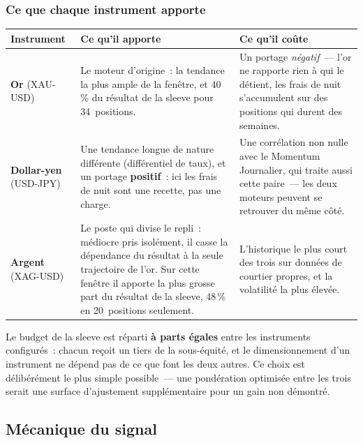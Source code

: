 \subsubsection*{Ce que chaque instrument apporte}

\begin{center}
\renewcommand{\arraystretch}{1.3}
\small
\begin{tabular}{>{\raggedright\arraybackslash}p{2.6cm}>{\raggedright\arraybackslash}p{6.0cm}>{\raggedright\arraybackslash}p{6.0cm}}
\toprule
\textbf{Instrument} & \textbf{Ce qu'il apporte} & \textbf{Ce qu'il coûte} \\
\midrule
\textbf{Or} (XAU-USD) & Le moteur d'origine~: la tendance la plus ample de la fenêtre, et 40\,\% du résultat de la sleeve pour 34~positions. & Un portage \emph{négatif}~--- l'or ne rapporte rien à qui le détient, les frais de nuit s'accumulent sur des positions qui durent des semaines. \\
\textbf{Dollar-yen} (USD-JPY) & Une tendance longue de nature différente (différentiel de taux), et un portage \textbf{positif}~: ici les frais de nuit sont une recette, pas une charge. & Une corrélation non nulle avec le Momentum Journalier, qui traite aussi cette paire~--- les deux moteurs peuvent se retrouver du même côté. \\
\textbf{Argent} (XAG-USD) & Le poste qui divise le repli~: médiocre pris isolément, il casse la dépendance du résultat à la seule trajectoire de l'or. Sur cette fenêtre il apporte la plus grosse part du résultat de la sleeve, 48\,\% en 20~positions seulement. & L'historique le plus court des trois sur données de courtier propres, et la volatilité la plus élevée. \\
\bottomrule
\end{tabular}
\end{center}

Le budget de la sleeve est réparti \textbf{à parts égales} entre les instruments configurés~: chacun reçoit un tiers de la sous-équité, et le dimensionnement d'un instrument ne dépend pas de ce que font les deux autres. Ce choix est délibérément le plus simple possible~--- une pondération optimisée entre les trois serait une surface d'ajustement supplémentaire pour un gain non démontré.

\subsection{Mécanique du signal}
\label{sec:gold_signal}

